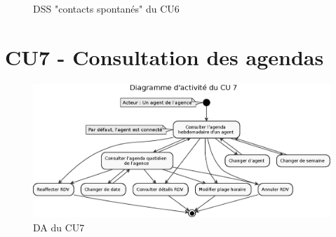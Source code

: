 \begin{figure}[H]
\noindent{}
\caption{DSS "contacts spontanés" du CU6}
\end{figure}

\clearpage
\section{CU7 - Consultation des agendas}
\begin{figure}[H]
\centering
\includegraphics[width=20cm, angle=90]{figures/eps/DA_CU7.eps}
\caption{DA du CU7}
\end{figure}


